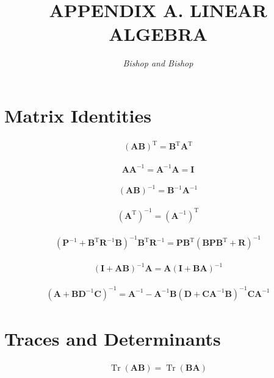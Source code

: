 \documentclass{article}
\title{\LARGE\scshape\MakeUppercase{Appendix A. Linear Algebra}}
\author{\textit{Bishop and Bishop}}
\date{}
\begin{document}
\maketitle

\section{Matrix Identities}

\begin{align*}
(\mathbf{A B})^{\mathrm{T}} = \mathbf{B}^{\mathrm{T}} \mathbf{A}^{\mathrm{T}} 
\tag{A.1}
\end{align*}

\begin{align*}
\mathbf{A} \mathbf{A}^{-1} = \mathbf{A}^{-1} \mathbf{A} = \mathbf{I}
\tag{A.2}
\end{align*}

\begin{align*}
(\mathbf{A B})^{-1} = \mathbf{B}^{-1} \mathbf{A}^{-1}
\tag{A.3}
\end{align*}

\begin{align*}
\left(\mathbf{A}^{\mathrm{T}}\right)^{-1} = \left(\mathbf{A}^{-1}\right)^{\mathrm{T}}
\tag{A.4}
\end{align*}

\begin{align*}
\left(\mathbf{P}^{-1} + \mathbf{B}^{\mathrm{T}} \mathbf{R}^{-1} \mathbf{B}\right)^{-1} \mathbf{B}^{\mathrm{T}} \mathbf{R}^{-1} = \mathbf{P} \mathbf{B}^{\mathrm{T}}\left(\mathbf{B} \mathbf{P} \mathbf{B}^{\mathrm{T}} + \mathbf{R}\right)^{-1}
\tag{A.5}
\end{align*}

\begin{align*}
(\mathbf{I} + \mathbf{A B})^{-1} \mathbf{A} = \mathbf{A}(\mathbf{I} + \mathbf{B} \mathbf{A})^{-1}
\tag{A.6}
\end{align*}

\begin{align*}
\left(\mathbf{A} + \mathbf{B D}^{-1} \mathbf{C}\right)^{-1} = \mathbf{A}^{-1} - \mathbf{A}^{-1} \mathbf{B}\left(\mathbf{D} + \mathbf{C A}^{-1} \mathbf{B}\right)^{-1} \mathbf{C A}^{-1}
\tag{A.7}
\end{align*}

\section{Traces and Determinants}

\begin{align*}
\operatorname{Tr}(\mathbf{A B}) = \operatorname{Tr}(\mathbf{B A})
\tag{A.8}
\end{align*}
\end{document}
